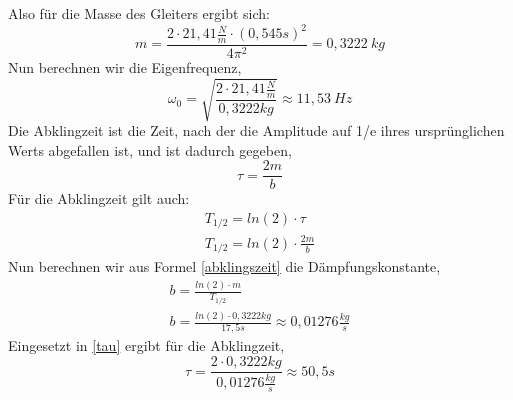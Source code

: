 \documentclass{article}
\begin{document}
          Also für die Masse des Gleiters ergibt sich:
          \begin{equation}
              m=\frac{2\cdot 21,41 \frac{N}{m} \cdot (0,545s)^2}{4\pi^2}= 0,3222\ kg
          \end{equation}
          Nun berechnen wir die Eigenfrequenz,
          \begin{equation}
              \omega_0= \sqrt{\frac{2\cdot 21,41 \frac{N}{m}}{0,3222kg}} \approx 11,53\ Hz
          \end{equation}
          Die Abklingzeit ist die Zeit, nach der die Amplitude auf 1/e ihres ursprünglichen Werts abgefallen ist, und ist dadurch gegeben,
          \begin{equation}\label{tau}
              \tau = \frac{2m}{b}
          \end{equation}
          Für die Abklingzeit gilt auch:\\
          \begin{equation} \label{abklingszeit}
              \begin{gathered}
                  T_{1/2}= ln(2) \cdot \tau \\
                  T_{1/2}= ln(2) \cdot \frac{2m}{b}
              \end{gathered}
          \end{equation}
          Nun berechnen wir aus Formel \ref{abklingszeit} die Dämpfungskonstante,
          \begin{equation}\label{formelb}
              \begin{gathered}
                  b=\frac{ln(2) \cdot m}{T_{1/2}}\\
                  b= \frac{ln(2) \cdot 0,3222kg}{17,5s} \approx 0,01276 \frac{kg}{s}
              \end{gathered}
          \end{equation}
          Eingesetzt in \ref{tau} ergibt für die Abklingzeit,
          \begin{equation}
              \tau= \frac{2\cdot 0,3222kg}{0,01276\frac{kg}{s}}\approx 50,5s
          \end{equation}
\end{document}
